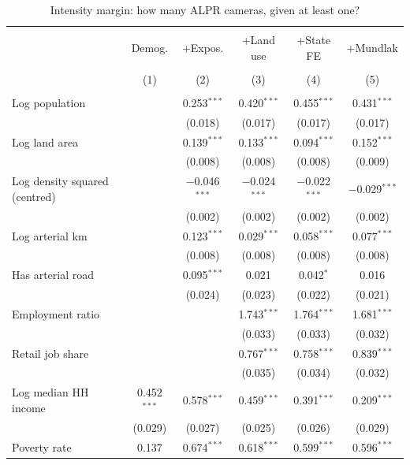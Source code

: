 
\begin{table}[!htbp] \centering 
  \caption{Intensity margin: how many ALPR cameras, given at least one?} 
  \label{tab:intensity-ladder} 
\footnotesize 
\setlength{\tabcolsep}{3pt}\begin{tabular}{@{}lccccc@{}} 
\\[-1.8ex]\hline 
\hline \\[-1.8ex] 
 & Demog. & +Expos. & +Land use & +State FE & +Mundlak \\ 
\\[-1.8ex] & (1) & (2) & (3) & (4) & (5)\\ 
\hline \\[-1.8ex] 
 Log population &  & 0.253$^{***}$ & 0.420$^{***}$ & 0.455$^{***}$ & 0.431$^{***}$ \\ 
  &  & (0.018) & (0.017) & (0.017) & (0.017) \\ 
  Log land area &  & 0.139$^{***}$ & 0.133$^{***}$ & 0.094$^{***}$ & 0.152$^{***}$ \\ 
  &  & (0.008) & (0.008) & (0.008) & (0.009) \\ 
  Log density squared (centred) &  & $-$0.046$^{***}$ & $-$0.024$^{***}$ & $-$0.022$^{***}$ & $-$0.029$^{***}$ \\ 
  &  & (0.002) & (0.002) & (0.002) & (0.002) \\ 
  Log arterial km &  & 0.123$^{***}$ & 0.029$^{***}$ & 0.058$^{***}$ & 0.077$^{***}$ \\ 
  &  & (0.008) & (0.008) & (0.008) & (0.008) \\ 
  Has arterial road &  & 0.095$^{***}$ & 0.021 & 0.042$^{*}$ & 0.016 \\ 
  &  & (0.024) & (0.023) & (0.022) & (0.021) \\ 
  Employment ratio &  &  & 1.743$^{***}$ & 1.764$^{***}$ & 1.681$^{***}$ \\ 
  &  &  & (0.033) & (0.033) & (0.032) \\ 
  Retail job share &  &  & 0.767$^{***}$ & 0.758$^{***}$ & 0.839$^{***}$ \\ 
  &  &  & (0.035) & (0.034) & (0.032) \\ 
  Log median HH income & 0.452$^{***}$ & 0.578$^{***}$ & 0.459$^{***}$ & 0.391$^{***}$ & 0.209$^{***}$ \\ 
  & (0.029) & (0.027) & (0.025) & (0.026) & (0.029) \\ 
  Poverty rate & 0.137 & 0.674$^{***}$ & 0.618$^{***}$ & 0.599$^{***}$ & 0.596$^{***}$ \\ 

\end{tabular}
\end{table}
